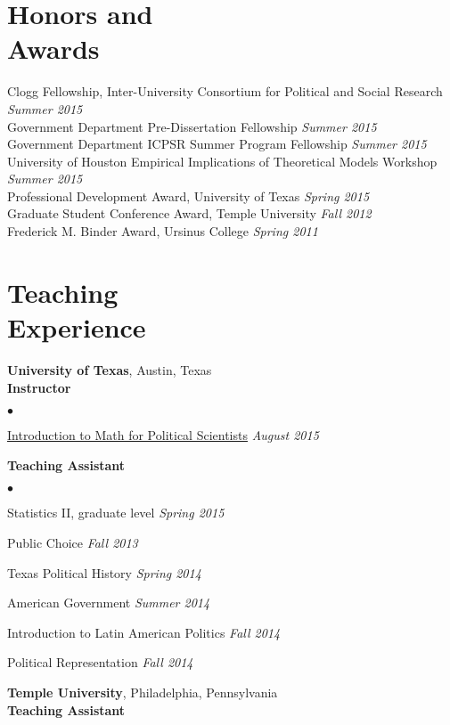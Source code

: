 \documentclass[margin,line]{res}
\newenvironment{list2}{
    \begin{list}{$\bullet$}{%
        \setlength{\itemsep}{0in}
        \setlength{\parsep}{0in} \setlength{\parskip}{0in}
        \setlength{\topsep}{0in} \setlength{\partopsep}{0in}
        \setlength{\leftmargin}{0.2in}}}{\end{list}}
\begin{document}
\begin{resume}
\section{\sc Honors and \\Awards}
Clogg Fellowship, Inter-University Consortium for Political and Social Research \hfill {\em Summer 2015} \\
Government Department Pre-Dissertation Fellowship   \hfill {\em Summer 2015} \\
Government Department ICPSR Summer Program Fellowship     \hfill    {\em Summer 2015} \\
University of Houston Empirical Implications of Theoretical Models Workshop  \hfill    {\em Summer 2015} \\
Professional Development Award, University of Texas \hfill    {\em Spring 2015} \\
Graduate Student Conference Award, Temple University \hfill    {\em Fall 2012} \\
Frederick M. Binder Award, Ursinus College \hfill    {\em Spring 2011} %

\section{\sc Teaching \\Experience}
{\bf University of Texas}, Austin, Texas  \\
{\bf Instructor}
\begin{list2}
	\item \href{https://github.com/jabranham/math-camp}{Introduction to Math for Political Scientists} \hfill {\em August 2015}
\end{list2}
{\bf Teaching Assistant} 

\begin{list2}
	\item Statistics II, graduate level \hfill {\em Spring 2015}
    \item Public Choice \hfill {\em Fall 2013}
    \item Texas Political History \hfill {\em Spring 2014}
    \item American Government \hfill {\em Summer 2014}
    \item Introduction to Latin American Politics \hfill {\em Fall 2014}
    \item Political Representation \hfill {\em Fall 2014}
\end{list2}

{\bf Temple University}, Philadelphia, Pennsylvania  \\
{\bf Teaching Assistant}


\end{resume}
\end{document}
